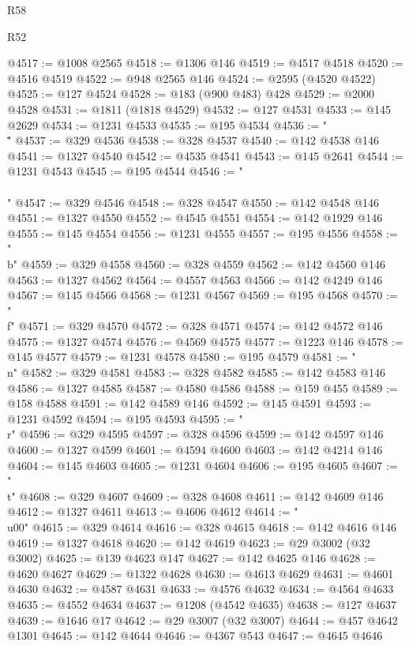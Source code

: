 \begin{lexlean}{R58}
\begin{lexlean}{R52}
\begin{coremodule}
{{{{{{{{{{{{{{{{{{{{{{{{{{{{{{{{{{{{{{{{{{{{{{{{{{{{{{{{{{{{{{{{{{{{{{{{{{{{{{{{{{{{{{{{{{{{{{{{{{{{{{{{{{{{{{{{{{{{{{{{{{{{{{{{{{{{{{{{{{{{{{{{{{{{{{{{{{{{{{{{{{{{{{{{{{{{{{{{{{{{{{{{{{{{{{{{{{{{{{@4517 := @1008 @2565
@4518 := @1306 @146
@4519 := @4517 @4518
@4520 := @4516 @4519
@4522 := @948 @2565 @146
@4524 := @2595 (@4520 @4522)
@4525 := @127 @4524
@4528 := @183 (@900 @483) @428
@4529 := @2000 @4528
@4531 := @1811 (@1818 @4529)
@4532 := @127 @4531
@4533 := @145 @2629
@4534 := @1231 @4533
@4535 := @195 @4534
@4536 := "\\\""
@4537 := @329 @4536
@4538 := @328 @4537
@4540 := @142 @4538 @146
@4541 := @1327 @4540
@4542 := @4535 @4541
@4543 := @145 @2641
@4544 := @1231 @4543
@4545 := @195 @4544
@4546 := "\\\\"
@4547 := @329 @4546
@4548 := @328 @4547
@4550 := @142 @4548 @146
@4551 := @1327 @4550
@4552 := @4545 @4551
@4554 := @142 @1929 @146
@4555 := @145 @4554
@4556 := @1231 @4555
@4557 := @195 @4556
@4558 := "\\b"
@4559 := @329 @4558
@4560 := @328 @4559
@4562 := @142 @4560 @146
@4563 := @1327 @4562
@4564 := @4557 @4563
@4566 := @142 @4249 @146
@4567 := @145 @4566
@4568 := @1231 @4567
@4569 := @195 @4568
@4570 := "\\f"
@4571 := @329 @4570
@4572 := @328 @4571
@4574 := @142 @4572 @146
@4575 := @1327 @4574
@4576 := @4569 @4575
@4577 := @1223 @146
@4578 := @145 @4577
@4579 := @1231 @4578
@4580 := @195 @4579
@4581 := "\\n"
@4582 := @329 @4581
@4583 := @328 @4582
@4585 := @142 @4583 @146
@4586 := @1327 @4585
@4587 := @4580 @4586
@4588 := @159 @455
@4589 := @158 @4588
@4591 := @142 @4589 @146
@4592 := @145 @4591
@4593 := @1231 @4592
@4594 := @195 @4593
@4595 := "\\r"
@4596 := @329 @4595
@4597 := @328 @4596
@4599 := @142 @4597 @146
@4600 := @1327 @4599
@4601 := @4594 @4600
@4603 := @142 @4214 @146
@4604 := @145 @4603
@4605 := @1231 @4604
@4606 := @195 @4605
@4607 := "\\t"
@4608 := @329 @4607
@4609 := @328 @4608
@4611 := @142 @4609 @146
@4612 := @1327 @4611
@4613 := @4606 @4612
@4614 := "\\u00"
@4615 := @329 @4614
@4616 := @328 @4615
@4618 := @142 @4616 @146
@4619 := @1327 @4618
@4620 := @142 @4619
@4623 := @29 @3002 (@32 @3002)
@4625 := @139 @4623 @147
@4627 := @142 @4625 @146
@4628 := @4620 @4627
@4629 := @1322 @4628
@4630 := @4613 @4629
@4631 := @4601 @4630
@4632 := @4587 @4631
@4633 := @4576 @4632
@4634 := @4564 @4633
@4635 := @4552 @4634
@4637 := @1208 (@4542 @4635)
@4638 := @127 @4637
@4639 := @1646 @17
@4642 := @29 @3007 (@32 @3007)
@4644 := @457 @4642 @1301
@4645 := @142 @4644
@4646 := @4367 @543
@4647 := @4645 @4646
}}}}}}}}}}}}}}}}}}}}}}}}}}}}}}}}}}}}}}}}}}}}}}}}}}}}}}}}}}}}}}}}}}}}}}}}}}}}}}}}}}}}}}}}}}}}}}}}}}}}}}}}}}}}}}}}}}}}}}}}}}}}}}}}}}}}}}}}}}}}}}}}}}}}}}}}}}}}}}}}}}}}}}}}}}}}}}}}}}}}}}}}}}}}}}}}}}}}}}
\end{coremodule}
\end{lexlean}
\end{lexlean}
